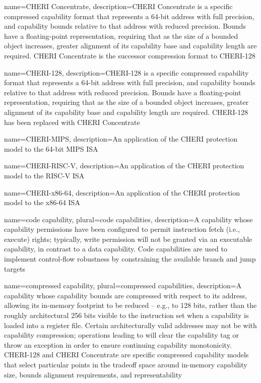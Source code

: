 {
  name=CHERI Concentrate,
  description={CHERI Concentrate is a specific \gls{compressed capability}
    format that represents a 64-bit \gls{address} with full precision, and
    \gls{capability bounds} relative to that address with reduced precision.
    Bounds have a floating-point representation, requiring that as the size of
    a bounded object increases, greater alignment of its \gls{capability base}
    and \gls{capability length} are required.
    CHERI Concentrate is the successor compression format to \gls{CHERI-128}}
}

{
  name=CHERI-128,
  description={CHERI-128 is a specific \gls{compressed capability} format that
    represents a 64-bit \gls{address} with full precision, and
    \gls{capability bounds} relative to that address with reduced precision.
    Bounds have a floating-point representation, requiring that as the size of
    a bounded object increases, greater alignment of its \gls{capability base}
    and \gls{capability length} are required.
    CHERI-128 has been replaced with \gls{CHERI Concentrate}}
}

{
  name=CHERI-MIPS,
  description={An application of the CHERI protection model to the 64-bit MIPS
    ISA}
}

{
  name=CHERI-RISC-V,
  description={An application of the CHERI protection model to the RISC-V ISA}
}

{
  name=CHERI-x86-64,
  description={An application of the CHERI protection model to the x86-64 ISA}
}

{
  name=code capability,
  plural=code capabilities,
  description={A \gls{capability} whose \gls{capability permissions} have been
    configured to permit instruction fetch (i.e., execute) rights; typically,
    write permission will not be granted via an executable capability, in
    contrast to a \gls{data capability}.
    Code capabilities are used to implement \gls{control-flow robustness} by
    constraining the available branch and jump targets}
}

{
  name=compressed capability,
  plural=compressed capabilities,
  description={A \gls{capability} whose \gls{capability bounds} are
    compressed with respect to its \gls{address}, allowing its
    in-memory footprint to be reduced -- e.g., to 128 bits, rather than the
    roughly
    architectural 256 bits visible to the instruction set when a capability
    is loaded into a register file.
    Certain architecturally valid 
    addresses may not be  with capability compression; operations leading
     to 
    will clear the \gls{capability tag} or throw an exception in order to
    ensure continuing \gls{capability monotonicity}.
    \gls{CHERI-128} and \gls{CHERI Concentrate} are specific compressed
    capability models that select particular points in the tradeoff space
    around in-memory capability size, bounds alignment requirements, and
    representability}
}


